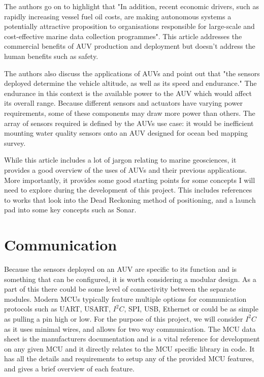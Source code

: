 \documentclass[11pt,a4paper,titlepage]{report}
\begin{document}
	The authors go on to highlight that "In addition, recent economic drivers, such as rapidly increasing vessel fuel oil costs, are making autonomous systems a potentially attractive proposition to organisations responsible for large-scale and cost-effective marine data collection programmes"\cite{AUV_PPF}. This article addresses the commercial benefits of AUV production and deployment but doesn't address the human benefits such as safety. 
	
	The authors also discuss the applications of AUVs and point out that "the sensors deployed determine the vehicle altitude, as well as its speed and endurance."\cite{AUV_PPF} The endurance in this context is the available power to the AUV which would affect its overall range. Because different sensors and actuators have varying power requirements, some of these components may draw more power than others. The array of sensors required is defined by the AUVs use case: it would be inefficient mounting water quality sensors onto an AUV designed for ocean bed mapping survey. 
	
	While this article includes a lot of jargon relating to marine geosciences, it provides a good overview of the uses of AUVs and their previous applications. More importantly, it provides some good starting points for some concepts I will need to  explore during the development of this project. This includes references to works that look into the Dead Reckoning method of positioning, and a launch pad into some key concepts such as Sonar. 
	
	\section*{Communication}
	Because the sensors deployed on an AUV are specific to its function and is something that can be configured, it is worth considering a modular design. As a part of this there could be some level of connectivity between the separate modules. Modern MCUs typically feature multiple options for communication protocols such as UART, USART, $I^{2}C$, SPI, USB, Ethernet or could be as simple as pulling a pin high or low. For the purpose of this project, we will consider $I^{2}C$ as it uses minimal wires, and allows for two way communication. The MCU data sheet\cite{ATTINY1627} is the manufacturers documentation and is a vital reference for development on any given  MCU and it directly relates to the MCU specific library in code. It has all the details and requirements to setup any of the provided MCU features, and gives a brief overview of each feature. 
	
\end{document}

